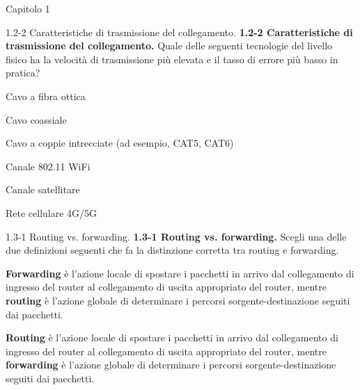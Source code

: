 \documentclass[a4paper]{article}
\begin{document}
\begin{quiz}{Capitolo 1}
\begin{multi}[points=1,shuffle=true]{1.2-2 Caratteristiche di trasmissione del collegamento.}
\textbf{1.2-2 Caratteristiche di trasmissione del collegamento.}
Quale delle seguenti tecnologie del livello fisico ha la velocità di trasmissione più elevata e il tasso di errore più basso in pratica?
\item* Cavo a fibra ottica
\item Cavo coassiale
\item Cavo a coppie intrecciate (ad esempio, CAT5, CAT6)
\item Canale 802.11 WiFi
\item Canale satellitare
\item Rete cellulare 4G/5G
\end{multi}

\begin{multi}[points=1,shuffle=true]{1.3-1 Routing vs. forwarding.}
\textbf{1.3-1 Routing vs. forwarding.}
Scegli una delle due definizioni seguenti che fa la distinzione corretta tra routing e forwarding.
\item* \textbf{Forwarding} è l'azione locale di spostare i pacchetti in arrivo dal collegamento di ingresso del router al collegamento di uscita appropriato del router, mentre \textbf{routing} è l'azione globale di determinare i percorsi sorgente-destinazione seguiti dai pacchetti.
\item \textbf{Routing} è l'azione locale di spostare i pacchetti in arrivo dal collegamento di ingresso del router al collegamento di uscita appropriato del router, mentre \textbf{forwarding} è l'azione globale di determinare i percorsi sorgente-destinazione seguiti dai pacchetti.
\end{multi}


\end{quiz}
\end{document}
